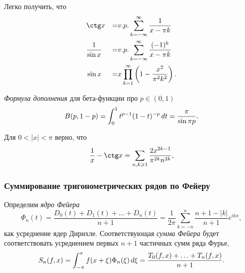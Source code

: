 \begin{to_lem}
     Легко получить, что
    \begin{align*}
        &\ctg x
        &=
        & v. p. \sum_{k=-\infty}^{\infty} \frac{1}{x-\pi k} \\
        &\frac{1}{\sin x}
        &=
        & v. p. \sum_{k=-\infty}^{\infty} \frac{(-1)^k}{x-\pi k} \\
        &\sin x
        &=
        & x \prod_{k=1}^{\infty} \left(
            1 - \frac{x^2}{\pi^2 k^2}
        \right).
    \end{align*}
\end{to_lem}


\begin{to_lem}
    \textit{Формула дополнения} для бета-функции про $p \in (0, 1)$
    \begin{equation*}
        B(p, 1-p) = \int_0^1 t^{p-1} (1-t)^{-p} \, d t = \frac{\pi}{\sin \pi p}.
    \end{equation*}
\end{to_lem}

\begin{to_lem}
    Для $0 < |x| < \pi$ верно, что
    \begin{equation*}
        \frac{1}{x} - \ctg x = 
        \sum_{n, k \geq 1} \frac{2 x^{2k-1}}{\pi^{2k} n^{2k}},
    \end{equation*}
\end{to_lem}


\subsubsection*{Суммирование тригонометрических рядов по Фейеру}


\begin{to_def}
    Определим \textit{ядро Фейера} 
    \begin{equation*}
        \Phi_n (t) = 
        \frac{D_0 (t) + D_1 (t) + \ldots + D_n (t)}{n+1} = 
        \frac{1}{2\pi} \sum_{k=-n}^{n} 
        \frac{n+1 - |k|}{n+1} e^{ikx},
    \end{equation*}
    как усреднение ядер Дирихле. Соответствующая \textit{сумма Фейера} будет соответствовать усреднением первых $n+1$ частичных сумм ряда Фурье,
    \begin{equation*}
        S_n (f, x) = \int_{-\pi}^{\pi} 
        f(x+\xi) \Phi_n (\xi) \, d \xi = 
        \frac{T_0 (f, x) + \ldots + T_n (f, x)}{n+1}.
    \end{equation*}
\end{to_def}

